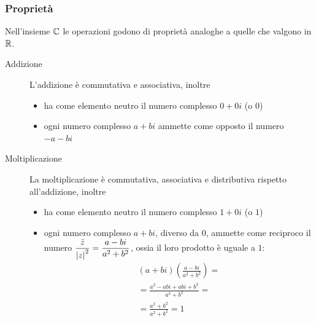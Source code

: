 \subsubsection{Proprietà}
Nell'insieme $\mathbb{C}$ le operazioni godono di proprietà analoghe a quelle che valgono in $\mathbb{R}$.
\begin{description}
	\item[Addizione] L'addizione è commutativa e associativa, inoltre
		\begin{itemize}
			\item ha come elemento neutro il numero complesso $0+0i$ (o $0$)
			\item ogni numero complesso $a+bi$ ammette come opposto il numero $-a-bi$
		\end{itemize}
	\item[Moltiplicazione] La moltiplicazione è commutativa, associativa e distributiva rispetto all'addizione, inoltre
		\begin{itemize}
			\item ha come elemento neutro il numero complesso $1+0i$ (o $1$)
			\item ogni numero complesso $a+bi$, diverso da $0$, ammette come reciproco il numero $\dfrac{\bar z}{\left\lvert z \right\rvert^2}=\dfrac{a-bi}{a^2+b^2}$, ossia il loro prodotto è uguale a $1$:
			      \begin{gather*}
				      ( a + bi ) \left( \frac{a - bi}{a^2 + b^2} \right) = \\
				      = \frac{a^2 - abi + abi + b^2}{a^2 + b^2} = \\
				      = \frac{a^2 + b^2}{a^2 + b^2} = 1
			      \end{gather*}
		\end{itemize}
\end{description}

